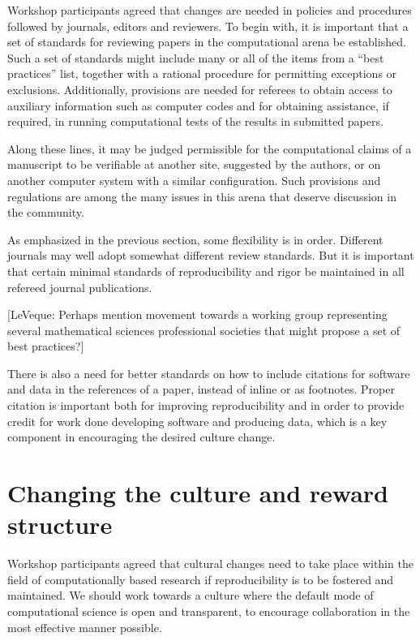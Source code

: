 \documentclass[11pt]{article}
\newcommand{\comment}[1]{{\color{blue} [#1]}}
\newcommand{\comment}[1]{}
\begin{document}
Workshop participants agreed that changes are needed in policies and
procedures followed by journals, editors and reviewers.
To begin with, it is important that a set of standards for reviewing papers
in the computational arena be established.  Such a set of standards might
include many or all of the items from a ``best practices'' list, 
together with a rational
procedure for permitting exceptions or exclusions.  Additionally, provisions
are needed for referees to obtain access to auxiliary information such as
computer codes and for obtaining assistance, if required, in running
computational tests of the results in submitted papers.

Along these lines, it may be judged permissible for  the computational
claims of a  manuscript
to be verifiable at another site, suggested by the
authors, or on another computer system with a similar configuration.  Such
provisions and regulations are among the many issues in this arena that
deserve discussion in the community.

As emphasized in the previous section, some flexibility is in order. 
Different journals may well adopt somewhat different review standards.
But it is important that certain minimal standards of reproducibility and
rigor be maintained in all refereed journal publications.

\comment{LeVeque: Perhaps mention movement towards a working group
representing several mathematical sciences professional societies
that might propose a set of best practices?}

There is also a need for better standards on how to 
include citations for software and data in the
references of a paper, instead of inline or as footnotes.
Proper citation is important both for improving reproducibility and in order
to provide credit for work done developing software and producing data,
which is a key component in encouraging the desired culture change.

\section{Changing the culture and reward structure} \label{sec:rewards}

Workshop participants agreed that cultural changes need to take
place within the field of computationally based research if
reproducibility is to be fostered and maintained.  We should work
towards a culture where the default mode of computational science
is open and transparent, to encourage collaboration in the most
effective manner possible.
\end{document}
